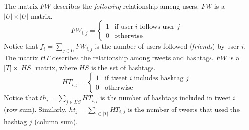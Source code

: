 The matrix $FW$ describes the \emph{following} relationship among users. $FW$ is a $|U| \times |U|$ matrix.
\begin{equation}\label{eq:following_rel}
FW_{i,j} = \begin{cases}
1 & \text{if user } i \text{ follows user } j \\
0 & \text{otherwise}
\end{cases}
\end{equation}
Notice that $f_i = \sum_{j \in U} FW_{i,j}$ is the number of users followed (\emph{friends}) by user $i$. \\

The matrix $HT$ describes the relationship among tweets and hashtags. $FW$ is a $|T| \times |HS|$ matrix, where $HS$ is the set of hashtags.
\begin{equation}\label{eq:hashtags_rel}
HT_{i,j} = \begin{cases}
1 & \text{if tweet } i \text{ includes hashtag } j \\
0 & \text{otherwise}
\end{cases}
\end{equation}
Notice that $th_i = \sum_{j \in HS} HT_{i,j}$ is the number of hashtags included in tweet $i$ (row sum). Similarly, $ht_j = \sum_{i \in |T|} HT_{i,j}$ is the number of tweets that used the hashtag $j$ (column sum).